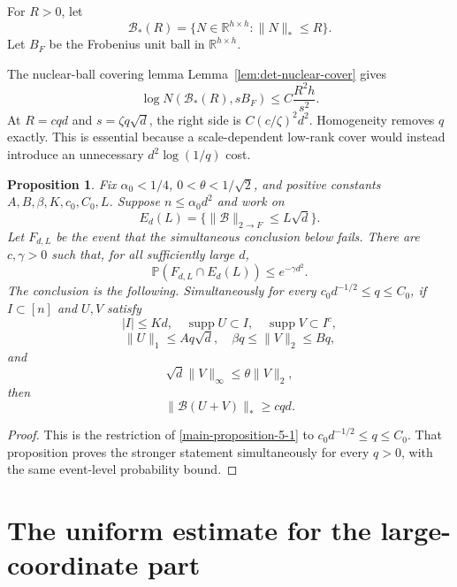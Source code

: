 \documentclass[11pt]{article}
\numberwithin{equation}{section}
\newtheorem{proposition}[theorem]{Proposition}
\theoremstyle{definition}
\theoremstyle{remark}
\newcommand{\Pp}{\mathbb P}
\newcommand{\1}{\boldsymbol 1}
\newcommand{\supp}{\operatorname{supp}}
\begin{document}
\begin{aiblock}
 
For $R>0$, let
\[
  \mathcal B_*(R)=\{N\in\mathbb R^{h\times h}:
  \|N\|_*\le R\}.
\]
Let $B_F$ be the Frobenius unit ball in
$\mathbb R^{h\times h}$.

The nuclear-ball covering lemma
Lemma~\ref{lem:det-nuclear-cover} gives
\[
  \log N(\mathcal B_*(R),sB_F)\le C\frac{R^2h}{s^2}.
\]
At $R=cqd$ and $s=\zeta q\sqrt d$, the right side is
$C(c/\zeta)^2d^2$. Homogeneity removes $q$ exactly. This
is essential because a scale-dependent low-rank cover
would instead introduce an unnecessary $d^2\log(1/q)$
cost.

\begin{proposition}\label{prop:small-coordinate-restatement}
  Fix $\alpha_0<1/4$, $0<\theta<1/\sqrt2$, and positive
  constants $A,B,\beta,K,c_0,C_0,L$. Suppose $n\le
  \alpha_0d^2$ and work on
  \[
    E_d(L)=\{\|\mathcal B\|_{2\to F}\le L\sqrt d\}.
  \]
  Let $F_{d,L}$ be the event that the simultaneous
  conclusion below fails. There are $c,\gamma>0$ such
  that, for all sufficiently large $d$,
  \[
    \Pp(F_{d,L}\cap E_d(L))\le e^{-\gamma d^2}.
  \]
  The conclusion is the following. Simultaneously for
  every $c_0d^{-1/2}\le q\le C_0$, if $I\subset[n]$ and
  $U,V$ satisfy
  \[
    |I|\le Kd,\quad\supp U\subset I,\quad\supp
    V\subset I^c,
  \]
  \[
    \|U\|_1\le Aq\sqrt d,\quad\beta q\le\|V\|_2\le Bq,
  \]
  and
  \[
    \sqrt d\|V\|_\infty\le\theta\|V\|_2,
  \]
  then
  \[
    \|\mathcal B(U+V)\|_*\ge cqd.
  \]
\end{proposition}

\begin{proof}
  This is the restriction of \cref{main-proposition-5-1}
  to $c_0d^{-1/2}\le q\le C_0$. That proposition proves
  the stronger statement simultaneously for every $q>0$,
  with the same event-level probability bound.
\end{proof}
\end{aiblock}


 
\section{The uniform estimate for the large-coordinate
  part}\label{the-uniform-estimate-for-the-large-coordinate-part}
\end{document}
